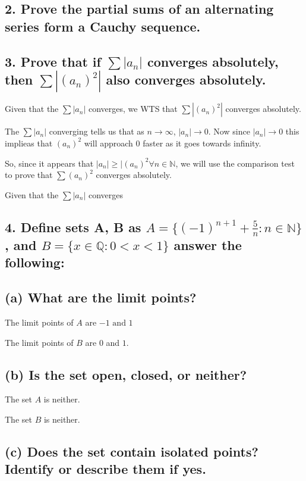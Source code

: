\documentclass{article}
\begin{document}
\subsection*{2. Prove the partial sums of an alternating series form a Cauchy sequence.}





\subsection*{3. Prove that if $\sum |a_n|$ converges absolutely, then $\sum |(a_n)^2|$ also converges absolutely.}

Given that the $\sum |a_n|$ converges, we WTS that $\sum |(a_n)^2|$ converges absolutely.

The $\sum |a_n|$ converging tells us that as $n \rightarrow \infty$, $|a_n| \rightarrow 0$. Now 
since $|a_n| \rightarrow 0$ this implieas that $(a_n)^2$ will approach 0 faster as it goes towards infinity.

So, since it appears that $|a_n| \ge |(a_n)^2 \forall n \in \mathbb{N}$, we will use the comparison test to prove that 
$\sum (a_n)^2$ converges absolutely.

Given that the $\sum |a_n|$ converges




\subsection*{4. Define sets A, B as $A = \{(-1)^{n+1} + \frac{5}{n} : n \in \mathbb{N}\}$, and $B = \{ x \in \mathbb{Q}: 0 < x < 1\}$ answer the following:}

\subsection*{(a) What are the limit points?}

The limit points of $A$ are $-1 \text{ and } 1$

The limit points of $B$ are $0$ and $1$.

\subsection*{(b) Is the set open, closed, or neither?}

The set $A$ is neither.

The set $B$ is neither.

\subsection*{(c) Does the set contain isolated points? Identify or describe them if yes.}
\end{document}
